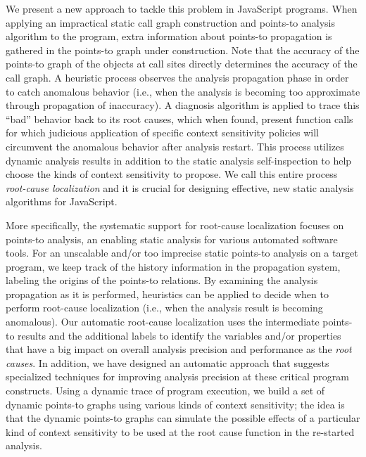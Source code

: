 We present a new approach to tackle this problem in JavaScript programs.
When applying an impractical static call graph construction and points-to analysis algorithm to the program, extra information about 
points-to propagation is gathered in the points-to graph under construction.
Note that the accuracy of the points-to graph of the objects at call sites directly determines the accuracy
of the call graph.
A heuristic process observes the analysis propagation phase
in order to catch anomalous behavior (i.e., when the analysis is 
becoming too approximate through propagation of inaccuracy). 
A diagnosis algorithm is applied to trace this ``bad'' behavior 
back to its root causes, which when found, present function calls for which 
judicious application of specific context sensitivity policies will circumvent 
the anomalous behavior after analysis restart. This process utilizes
dynamic analysis results in addition  to the static analysis 
self-inspection to help choose the kinds of context sensitivity to propose.
We call this entire process {\it root-cause localization}
and it is crucial for designing effective, new static analysis algorithms
for JavaScript.
\begin{comment}
Thus, our contribution described in this paper
is (i) a semi-automated process for root-cause  localization
to help apply static analysis effectively to real-world Javascript programs,
and (ii) convincing empirical results of applying this process to two
benchmark suites of JavaScript codes, in cases allowing formerly
runaway static analyses of several programs to complete and 
offer a safe static solution.
\end{comment}

More specifically, the systematic support for root-cause localization
focuses on points-to analysis, an enabling static
analysis for various automated software tools. For an
unscalable and/or too imprecise static points-to analysis on a
target program, we keep track of the history information in
the propagation system, labeling the origins of the points-to
relations. By examining the analysis propagation as 
it is performed, heuristics can be applied to decide when to
perform root-cause localization (i.e., when the analysis
result is becoming anomalous). Our automatic root-cause
localization uses the intermediate points-to results and the
additional labels to identify the variables and/or properties
that have a big impact on overall analysis precision and
performance as the {\it root causes}. In addition, we have designed
an automatic approach that suggests specialized techniques
for improving analysis precision at these critical program
constructs. Using a dynamic trace of program execution,
we build a set of dynamic points-to graphs using various kinds
of context sensitivity; the idea is that the dynamic points-to graphs
can simulate the possible effects of a particular kind of 
context sensitivity to be used at the root cause function
in the re-started analysis.

